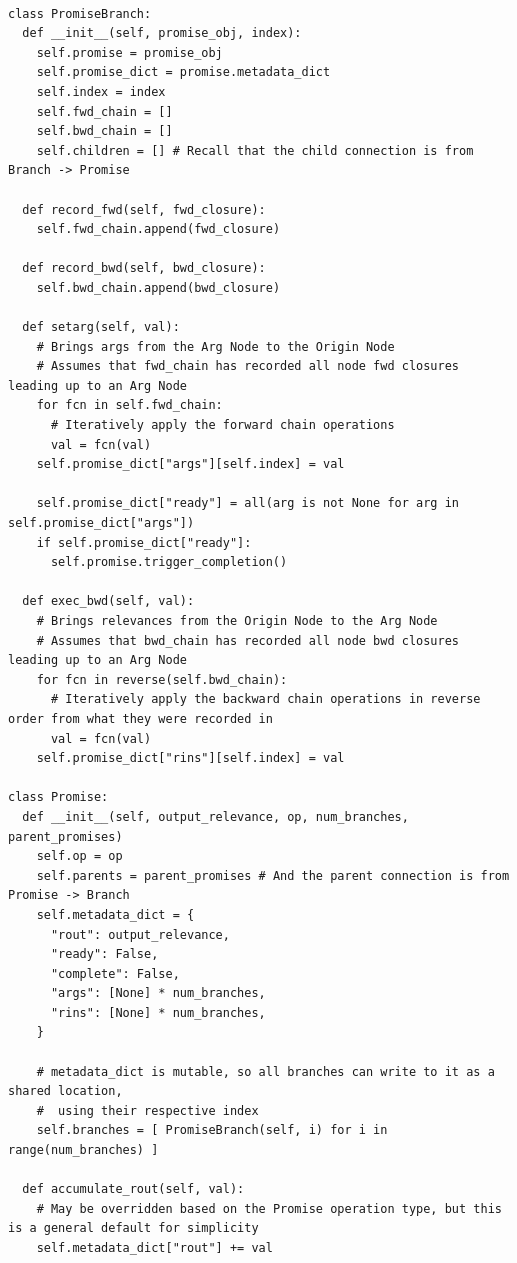 \documentclass{article}
\begin{document}
\begin{verbatim}

class PromiseBranch:
  def __init__(self, promise_obj, index):
    self.promise = promise_obj
    self.promise_dict = promise.metadata_dict
    self.index = index
    self.fwd_chain = []
    self.bwd_chain = []
    self.children = [] # Recall that the child connection is from Branch -> Promise

  def record_fwd(self, fwd_closure):
    self.fwd_chain.append(fwd_closure)

  def record_bwd(self, bwd_closure):
    self.bwd_chain.append(bwd_closure)

  def setarg(self, val):
    # Brings args from the Arg Node to the Origin Node
    # Assumes that fwd_chain has recorded all node fwd closures leading up to an Arg Node
    for fcn in self.fwd_chain:
      # Iteratively apply the forward chain operations
      val = fcn(val)
    self.promise_dict["args"][self.index] = val

    self.promise_dict["ready"] = all(arg is not None for arg in self.promise_dict["args"])
    if self.promise_dict["ready"]:
      self.promise.trigger_completion()

  def exec_bwd(self, val):
    # Brings relevances from the Origin Node to the Arg Node
    # Assumes that bwd_chain has recorded all node bwd closures leading up to an Arg Node
    for fcn in reverse(self.bwd_chain):
      # Iteratively apply the backward chain operations in reverse order from what they were recorded in
      val = fcn(val)
    self.promise_dict["rins"][self.index] = val

class Promise:
  def __init__(self, output_relevance, op, num_branches, parent_promises)
    self.op = op
    self.parents = parent_promises # And the parent connection is from Promise -> Branch
    self.metadata_dict = {
      "rout": output_relevance,
      "ready": False,
      "complete": False,
      "args": [None] * num_branches,
      "rins": [None] * num_branches,
    }

    # metadata_dict is mutable, so all branches can write to it as a shared location,
    #  using their respective index
    self.branches = [ PromiseBranch(self, i) for i in range(num_branches) ]
  
  def accumulate_rout(self, val):
    # May be overridden based on the Promise operation type, but this is a general default for simplicity
    self.metadata_dict["rout"] += val


\end{verbatim}
\end{document}
